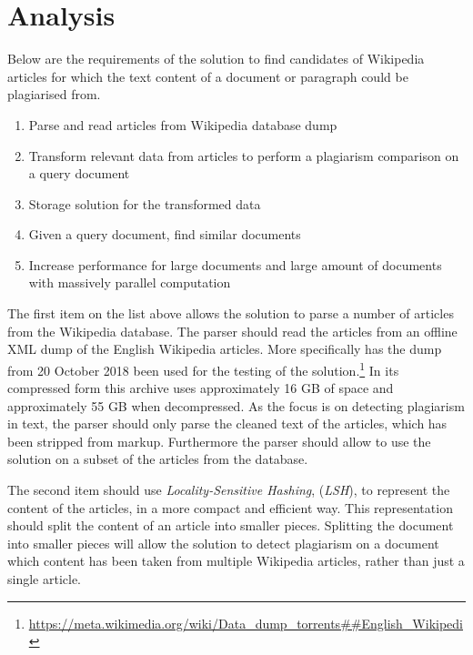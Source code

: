 \section{Analysis}

Below are the requirements of the solution to find candidates of Wikipedia articles for which the text content of a document or paragraph could be plagiarised from.

\begin{enumerate}
    \item Parse and read articles from Wikipedia database dump
    \item Transform relevant data from articles to perform a plagiarism comparison on a query document
    \item Storage solution for the transformed data
    \item Given a query document, find similar documents
    \item Increase performance for large documents and large amount of documents with massively parallel computation
\end{enumerate}


The first item on the list above allows the solution to parse a number of articles from the Wikipedia database. The parser should read the articles from an offline XML dump of the English Wikipedia articles. More specifically has the dump from 20 October 2018 been used for the testing of the solution.\footnote{\url{https://meta.wikimedia.org/wiki/Data_dump_torrents##English_Wikipedi}} In its compressed form this archive uses approximately 16 GB of space and approximately 55 GB when decompressed. As the focus is on detecting plagiarism in text, the parser should only parse the cleaned text of the articles, which has been stripped from markup. Furthermore the parser should allow to use the solution on a subset of the articles from the database.

The second item should use \emph{Locality-Sensitive Hashing}, (\emph{LSH}), to represent the content of the articles, in a more compact and efficient way. This representation should split the content of an article into smaller pieces. Splitting the document into smaller pieces will allow the solution to detect plagiarism on a document which content has been taken from multiple Wikipedia articles, rather than just a single article.

